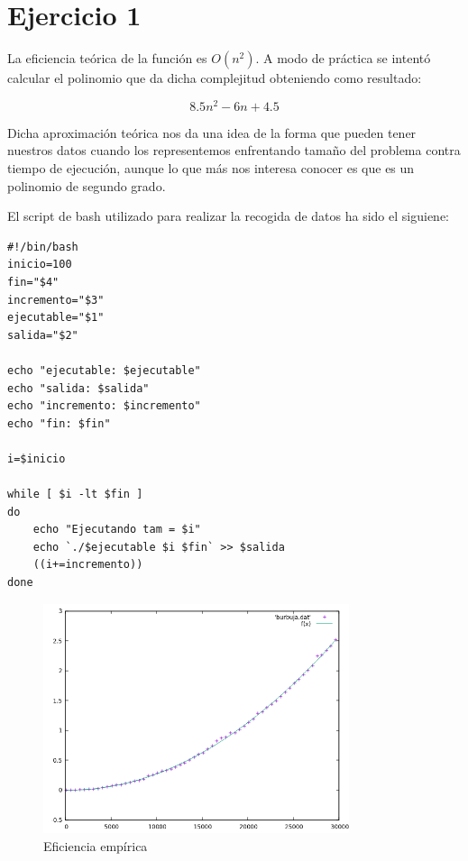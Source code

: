 \section*{Ejercicio 1}


\begin{flushleft}
  La eficiencia teórica de la función es $O(n^2)$. A modo de práctica
  se intentó calcular el polinomio que da dicha complejitud obteniendo
  como resultado:

  \[
    8.5n^2 -6n + 4.5
  \]

  Dicha aproximación teórica nos da una idea de la forma que pueden
  tener nuestros datos cuando los representemos enfrentando tamaño del
  problema contra tiempo de ejecución, aunque lo que más nos interesa
  conocer es que es un polinomio de segundo grado.
\end{flushleft}


\begin{flushleft}
  El script de bash utilizado para realizar la recogida de datos ha
  sido el siguiene:
\end{flushleft}
\newpage
\begin{verbatim}
#!/bin/bash
inicio=100
fin="$4"
incremento="$3"
ejecutable="$1"
salida="$2"

echo "ejecutable: $ejecutable"
echo "salida: $salida"
echo "incremento: $incremento"
echo "fin: $fin"

i=$inicio

while [ $i -lt $fin ]
do
    echo "Ejecutando tam = $i"
    echo `./$ejecutable $i $fin` >> $salida
    ((i+=incremento))
done

\end{verbatim}


\begin{figure}[H]
  \centering
  \caption{Eficiencia empírica}
  \includegraphics[width=0.8\textwidth]{ejer1/comparacion.png}
\end{figure}